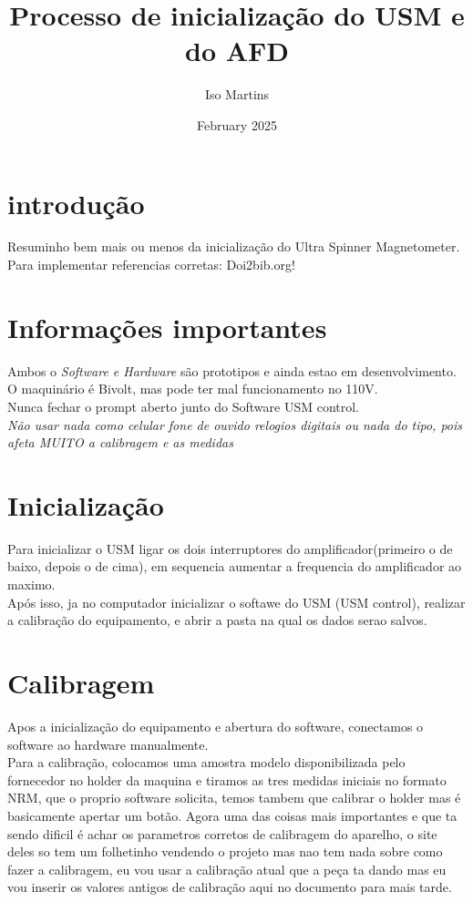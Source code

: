 \documentclass{paper}[geophysics]
\title{Processo de inicialização do USM e do AFD}
\author{ Iso Martins }
\date{February 2025}
\begin{document}
\maketitle

\section{introdução}
  Resuminho bem mais ou menos da inicialização do Ultra Spinner Magnetometer.\\
  Para implementar referencias corretas: Doi2bib.org!\\
	
\section{Informações importantes}
Ambos o \emph{Software e Hardware} são prototipos e ainda estao em desenvolvimento.\\
O maquinário é Bivolt, mas pode ter mal funcionamento no 110V.\\
Nunca fechar o prompt aberto junto do Software USM control.\\
\emph{Não usar nada como celular fone de ouvido relogios digitais ou nada do tipo, pois afeta MUITO a calibragem e as medidas}\\

\section{Inicialização}
Para inicializar o USM ligar os dois interruptores do amplificador(primeiro o de baixo, depois o de cima), em sequencia aumentar a frequencia do amplificador ao maximo.\\
Após isso, ja no computador inicializar o softawe do USM (USM control), realizar a calibração do equipamento, e abrir a pasta na qual os dados serao salvos.

\section{Calibragem}
Apos a inicialização do equipamento e abertura do software, conectamos o software ao hardware manualmente.\\
Para a calibração, colocamos uma amostra modelo disponibilizada pelo fornecedor no holder da maquina e tiramos as tres medidas iniciais no formato NRM, que o proprio software solicita, temos tambem que calibrar o holder mas é basicamente apertar um botão. Agora uma das coisas mais importantes e que ta sendo dificil é achar os parametros corretos de calibragem do aparelho, o site deles so tem um folhetinho vendendo o projeto mas nao tem nada sobre como fazer a calibragem, eu vou usar a calibração atual que a peça ta dando mas eu vou inserir os valores antigos de calibração aqui no documento para mais tarde.\\
\end{document}
